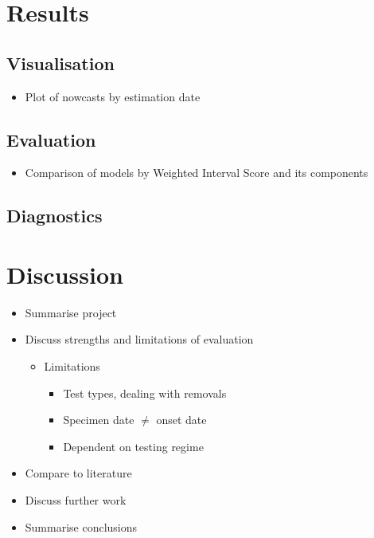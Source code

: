\documentclass[
  a4paper,
]{article}
\providecommand{\tightlist}{%
  \setlength{\itemsep}{0pt}\setlength{\parskip}{0pt}}\usepackage{longtable,booktabs,array}
\begin{document}
\hypertarget{results}{%
\section{Results}\label{results}}

\hypertarget{visualisation}{%
\subsection{Visualisation}\label{visualisation}}

\begin{itemize}
\tightlist
\item
  Plot of nowcasts by estimation date
\end{itemize}

\hypertarget{evaluation-1}{%
\subsection{Evaluation}\label{evaluation-1}}

\begin{itemize}
\tightlist
\item
  Comparison of models by Weighted Interval Score and its components
\end{itemize}

\hypertarget{diagnostics}{%
\subsection{Diagnostics}\label{diagnostics}}

\hypertarget{discussion}{%
\section{Discussion}\label{discussion}}

\begin{itemize}
\tightlist
\item
  Summarise project
\item
  Discuss strengths and limitations of evaluation

  \begin{itemize}
  \tightlist
  \item
    Limitations

    \begin{itemize}
    \tightlist
    \item
      Test types, dealing with removals
    \item
      Specimen date \(\neq\) onset date
    \item
      Dependent on testing regime
    \end{itemize}
  \end{itemize}
\item
  Compare to literature
\item
  Discuss further work
\item
  Summarise conclusions
\end{itemize}
\end{document}
